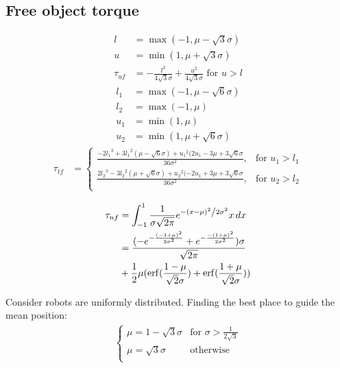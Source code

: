 \subsection{Free object torque}
\begin{align}
l &= \max({-1,\mu -\sqrt{3} \sigma})\\
u &= \min({1,\mu+\sqrt{3}\sigma})\\
\tau_{uf} &= -\frac{l^2}{4\sqrt{3}\sigma}+ \frac{u^2}{4\sqrt{3}\sigma} \textrm{  for    }  u>l
\end{align}
\begin{align}
l_1 &= \max({-1,\mu-\sqrt{6}\sigma})\\ \nonumber
l_2 &= \max({-1,\mu})\\ \nonumber
u_1 &= \min({1,\mu})\\ \nonumber
u_2 &= \min({1,\mu+\sqrt{6}\sigma}) \nonumber
\end{align}
\begin{align}
\tau_{tf} &=  \left\{
\begin{array}{ll}
\frac{-2{l_1}^3+3{l_1}^2(\mu-\sqrt{6}\sigma)+{u_1}^2(2u_1 - 3\mu+3\sqrt{6}\sigma}{36\sigma^2}, &   \textrm{for     } u_1 > l_1\\
\frac{2{l_2}^3-3{l_2}^2(\mu+\sqrt{6}\sigma)+{u_2}^2(-2u_1 + 3\mu+3\sqrt{6}\sigma}{36\sigma^2}, &   \textrm{for     } u_2 > l_2\\
\end{array} 
\right.
\end{align}


\begin{align} \nonumber
\tau_{nf} &= \int_{-1}^1\frac{1}{{\sigma \sqrt {2\pi } }}e^{{{ - \left( {x - \mu } \right)^2 } \mathord{\left/ {\vphantom {{ - \left( {x - \mu } \right)^2 } {2\sigma ^2 }}} \right. \kern-\nulldelimiterspace} {2\sigma ^2 }}} x \, dx\\
 &= \frac{(-e^{-\frac{(-1+\mu)^2}{2\sigma^2}}+e^{-\frac{-(1+\mu)^2}{2\sigma^2}})\sigma}{\sqrt{2\pi}}\\
 &+ \frac{1}{2}\mu(\erf(\frac{1-\mu}{\sqrt{2}\sigma})+\erf(\frac{1+\mu}{\sqrt{2}\sigma})) 
\end{align}


Consider robots are uniformly distributed. Finding the best place to guide the mean position:
\begin{align}
\left\{
\begin{array}{ll}
\mu = 1-\sqrt{3}\sigma &   \textrm{for     } \sigma > \frac{1}{2\sqrt{3}}\\
\mu = \sqrt{3}\sigma &   \textrm{otherwise}\\
\end{array} 
\right.
\end{align}

